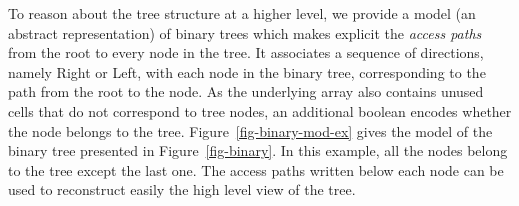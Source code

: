 \documentclass{llncs}
\begin{document}




To reason about the tree structure at a higher level, we provide a model
(an abstract representation) of binary trees
which makes explicit the
\emph{access paths} from the root to every node in the tree.
It associates a sequence of
directions, namely Right or Left, with each node in the binary tree,
corresponding to the path from the root to the node. As the underlying array
also contains unused cells that do not correspond to tree nodes, an additional
boolean encodes whether the node belongs to the
tree. Figure~\ref{fig-binary-mod-ex} gives the model of the binary tree
presented in Figure~\ref{fig-binary}. In this example, all the nodes belong to
the tree except the last one. The access paths written below each node can be used to
reconstruct easily the high level view of the tree.
\end{document}
